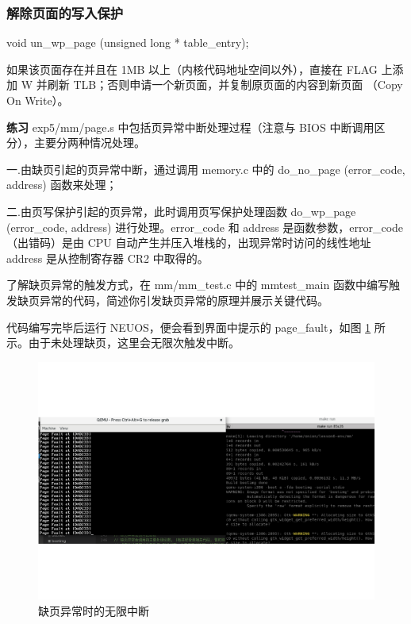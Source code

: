 \subsubsection{解除页面的写入保护}

void un\_wp\_page (unsigned long * table\_entry);

如果该页面存在并且在 1MB 以上（内核代码地址空间以外），直接在 FLAG 上添加 W 并刷新 TLB；否则申请一个新页面，并复制原页面的内容到新页面 （Copy On Write）。


\begin{mdframed}[hidealllines=true,backgroundcolor=gray!20]
\textbf{练习 }exp5/mm/page.s 中包括页异常中断处理过程（注意与 BIOS 中断调用区分），主要分两种情况处理。

一.由缺页引起的页异常中断，通过调用 memory.c 中的 do\_no\_page (error\_code, address) 函数来处理；

二.由页写保护引起的页异常，此时调用页写保护处理函数 do\_wp\_page (error\_code, address) 进行处理。error\_code 和 address 是函数参数，error\_code（出错码）是由 CPU 自动产生并压入堆栈的，出现异常时访问的线性地址 address 是从控制寄存器 CR2 中取得的。

了解缺页异常的触发方式，在 mm/mm\_test.c 中的 mmtest\_main 函数中编写触发缺页异常的代码，简述你引发缺页异常的原理并展示关键代码。

代码编写完毕后运行 NEUOS，便会看到界面中提示的 page\_fault，如图 \ref{fig:缺页异常时的无限中断} 所示。由于未处理缺页，这里会无限次触发中断。
\end{mdframed}

\begin{figure}[htbp]
    \centering
    \includegraphics[width=\textwidth]{img/缺页异常时的无限中断.pdf}
    \caption{缺页异常时的无限中断}
    \label{fig:缺页异常时的无限中断}
\end{figure}

